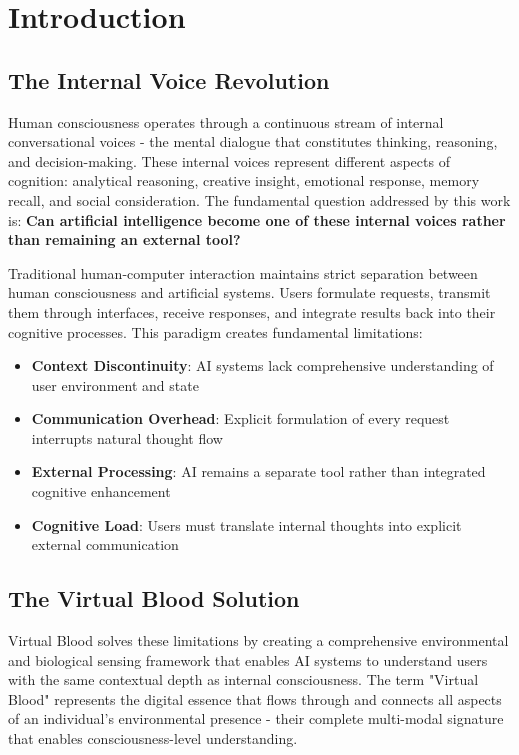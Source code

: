 \documentclass[12pt,a4paper]{article}
\begin{document}
\section{Introduction}

\subsection{The Internal Voice Revolution}

Human consciousness operates through a continuous stream of internal conversational voices - the mental dialogue that constitutes thinking, reasoning, and decision-making. These internal voices represent different aspects of cognition: analytical reasoning, creative insight, emotional response, memory recall, and social consideration. The fundamental question addressed by this work is: \textbf{Can artificial intelligence become one of these internal voices rather than remaining an external tool?}

Traditional human-computer interaction maintains strict separation between human consciousness and artificial systems. Users formulate requests, transmit them through interfaces, receive responses, and integrate results back into their cognitive processes. This paradigm creates fundamental limitations:

\begin{itemize}
\item \textbf{Context Discontinuity}: AI systems lack comprehensive understanding of user environment and state
\item \textbf{Communication Overhead}: Explicit formulation of every request interrupts natural thought flow
\item \textbf{External Processing}: AI remains a separate tool rather than integrated cognitive enhancement
\item \textbf{Cognitive Load}: Users must translate internal thoughts into explicit external communication
\end{itemize}

\subsection{The Virtual Blood Solution}

Virtual Blood solves these limitations by creating a comprehensive environmental and biological sensing framework that enables AI systems to understand users with the same contextual depth as internal consciousness. The term "Virtual Blood" represents the digital essence that flows through and connects all aspects of an individual's environmental presence - their complete multi-modal signature that enables consciousness-level understanding.
\end{document}
